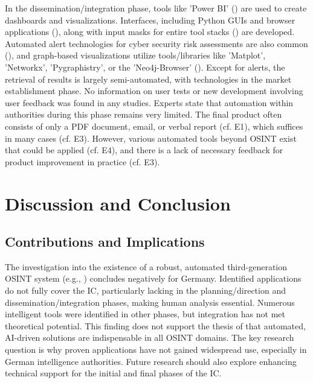 \documentclass[10pt]{article}
\begin{document}
In the dissemination/integration phase, tools like 'Power BI' (\cite{Tao.2023}) are used to create dashboards and visualizations. Interfaces, including Python GUIs and browser applications (\cite{Elmas.2022}), along with input masks for entire tool stacks (\cite{Arjun.2020}) are developed. Automated alert technologies for cyber security risk assessments are also common (\cite{Ahuja.2022}), and graph-based visualizations utilize tools/libraries like 'Matplot', 'Networkx', 'Pygraphistry', or the 'Neo4j-Browser' (\cite{Middleton.2020}). Except for alerts, the retrieval of results is largely semi-automated, with technologies in the market establishment phase. No information on user tests or new development involving user feedback was found in any studies. Experts state that automation within authorities during this phase remains very limited. The final product often consists of only a PDF document, email, or verbal report (cf. E1), which suffices in many cases (cf. E3). However, various automated tools beyond OSINT exist that could be applied (cf. E4), and there is a lack of necessary feedback for product improvement in practice (cf. E3).

\section{Discussion and Conclusion} \label{sec:discussion}
\subsection{Contributions and Implications}

The investigation into the existence of a robust, automated third-generation OSINT system (e.g., \cite{Ghioni.2023}) concludes negatively for Germany. Identified applications do not fully cover the IC, particularly lacking in the planning/direction and dissemination/integration phases, making human analysis essential. Numerous intelligent tools were identified in other phases, but integration has not met theoretical potential. This finding does not support the thesis of \textcite{Yogish.2021} that automated, AI-driven solutions are indispensable in all OSINT domains. The key research question is why proven applications have not gained widespread use, especially in German intelligence authorities. Future research should also explore enhancing technical support for the initial and final phases of the IC.
\end{document}
